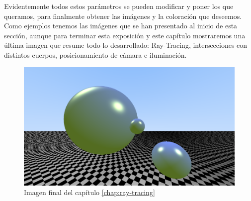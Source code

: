 Evidentemente todos estos parámetros se pueden modificar y poner los que queramos, para finalmente obtener las imágenes y la coloración que deseemos. Como ejemplos tenemos las imágenes que se han presentado al inicio de esta sección, aunque para terminar esta exposición y este capítulo mostraremos una última imagen que resume todo lo desarrollado: Ray-Tracing, intersecciones con distintos cuerpos, posicionamiento de cámara e iluminación.

\begin{figure} [ht]
    \centering
    \includegraphics[scale = 0.28]{img/C7/phong-final.png}
    \caption{Imagen final del capítulo \ref{chap:ray-tracing}}
    \label{fig:imagen-final}
\end{figure}

